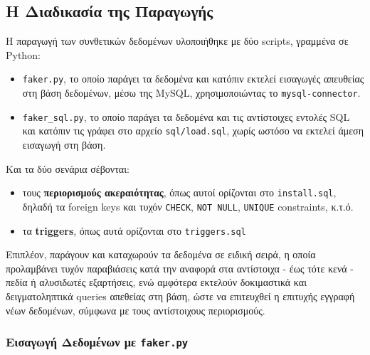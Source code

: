 \documentclass[13pt]{extarticle}
\begin{document}
\subsection{Η Διαδικασία της Παραγωγής}

Η παραγωγή των συνθετικών δεδομένων υλοποιήθηκε με δύο scripts, γραμμένα σε Python:
\begin{itemize}
    \item \texttt{faker.py}, το οποίο παράγει τα δεδομένα και κατόπιν εκτελεί εισαγωγές απευθείας στη βάση δεδομένων, μέσω της MySQL, χρησιμοποιώντας το \texttt{mysql-connector}.
    \item \texttt{faker\_sql.py}, το οποίο παράγει τα δεδομένα και τις αντίστοιχες εντολές SQL και κατόπιν τις γράφει στο αρχείο \texttt{sql/load.sql}, χωρίς ωστόσο να εκτελεί άμεση εισαγωγή στη βάση.
\end{itemize}

Και τα δύο σενάρια σέβονται:
\begin{itemize}
    \item τους \textbf{περιορισμούς ακεραιότητας}, όπως αυτοί ορίζονται στο \texttt{install.sql}, δηλαδή τα foreign keys και τυχόν \texttt{CHECK}, \texttt{NOT NULL}, \texttt{UNIQUE} constraints, κ.τ.ό.
    \item τα \textbf{triggers}, όπως αυτά ορίζονται στο \texttt{triggers.sql}
\end{itemize}
Επιπλέον, παράγουν και καταχωρούν τα δεδομένα σε ειδική σειρά, η οποία προλαμβάνει τυχόν παραβιάσεις κατά την αναφορά στα αντίστοιχα - έως τότε κενά - πεδία ή αλυσιδωτές εξαρτήσεις, ενώ αμφότερα εκτελούν δοκιμαστικά και δειγματοληπτικά queries απεθείας στη βάση, ώστε να επιτευχθεί η επιτυχής εγγραφή νέων δεδομένων, σύμφωνα με τους αντίστοιχους περιορισμούς.

\subsubsection{Εισαγωγή Δεδομένων με \texttt{faker.py}}
\end{document}
